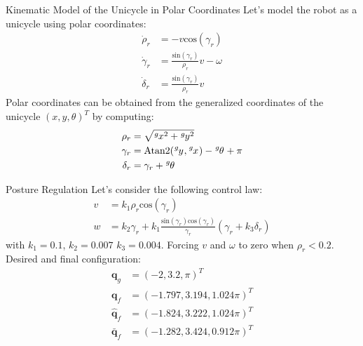 \documentclass[10pt]{beamer}
\begin{document}
    \begin{frame}{Kinematic Model of the Unicycle in Polar Coordinates}
        \justifying
        Let's model the robot as a unicycle using polar coordinates:
        \begin{align*}
            \dot{\rho}_r &= -v \text{cos}(\gamma_r) \\
            \dot{\gamma}_r &= \frac{\text{sin}(\gamma_r)}{\rho_r}v - \omega \\
            \dot{\delta}_r &= \frac{\text{sin}(\gamma_r)}{\rho_r}v
        \end{align*}
        Polar coordinates can be obtained from the generalized
        coordinates of the unicycle $(x, y, \theta)^T$ by computing:
        \begin{align*}
            \rho_r &= \sqrt{\tensor[^g]{x}{^2} + \tensor[^g]{y}{^2}} \\
            \gamma_r &= \text{Atan2}(\tensor[^g]{y}{}, \tensor[^g]{x}{}) - \tensor[^g]{\theta}{} + \pi \\
            \delta_r &= \gamma_r + \tensor[^g]{\theta}{}
        \end{align*}
    \end{frame}

    \begin{frame}{Posture Regulation}
        \justifying
        Let's consider the following control law:
        \begin{align*}
            v &= k_1 \rho_r \text{cos}(\gamma_r) \\
            w &= k_2 \gamma_r + k_1 \frac{\text{sin}(\gamma_r) \text{cos}(\gamma_r)}{\gamma_r}(\gamma_r + k_3 \delta_r)
        \end{align*}
        with $k_1 = 0.1$, $k_2 = 0.007$ $k_3 = 0.004$. Forcing $v$ and $\omega$ to zero when
        $\rho_r < 0.2$. Desired and final configuration:
        \begin{align*}
            \bm{q}_g &= (-2, 3.2, \pi)^T \\
            \bm{q}_f &= (-1.797, 3.194, 1.024\pi)^T \\
            \bm{\hat{q}}_f &= (-1.824, 3.222, 1.024\pi)^T \\
            \bm{\bar{q}}_f &= (-1.282, 3.424, 0.912\pi)^T
        \end{align*}
    \end{frame}
\end{document}
